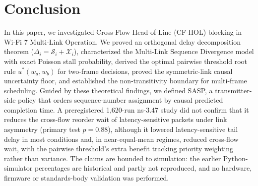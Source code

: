 \documentclass[10pt,journal,compsoc]{IEEEtran}
\begin{document}
\section{Conclusion}
\label{sec:conclusion}

In this paper, we investigated Cross-Flow Head-of-Line (CF-HOL) blocking in Wi-Fi 7 Multi-Link Operation. We proved an orthogonal delay decomposition theorem ($\Delta_i = \mathcal{S}_i + \mathcal{X}_i$), characterized the Multi-Link Sequence Divergence model with exact Poisson stall probability, derived the optimal pairwise threshold root rule $u^*(w_a, w_b)$ for two-frame decisions, proved the symmetric-link causal uncertainty floor, and established the non-transitivity boundary for multi-frame scheduling. Guided by these theoretical findings, we defined SASP, a transmitter-side policy that orders sequence-number assignment by causal predicted completion time. A preregistered 1{,}620-run ns-3.47 study did not confirm that it reduces the cross-flow reorder wait of latency-sensitive packets under link asymmetry (primary test $p=0.88$), although it lowered latency-sensitive tail delay in most conditions and, in near-equal-mean regimes, reduced cross-flow wait, with the pairwise threshold's extra benefit tracking priority weighting rather than variance. The claims are bounded to simulation: the earlier Python-simulator percentages are historical and partly not reproduced, and no hardware, firmware or standards-body validation was performed.



\end{document}
